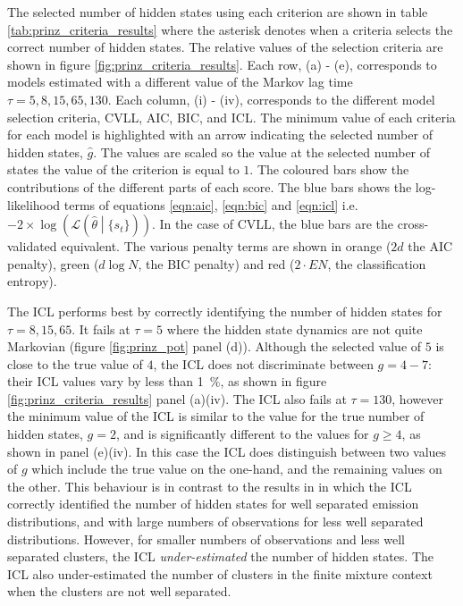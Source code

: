 The selected number of hidden states using each criterion are shown in table \ref{tab:prinz_criteria_results} where the asterisk denotes when a criteria selects the correct number of hidden states. The relative values of the selection criteria are shown in figure \ref{fig:prinz_criteria_results}. Each row, (a) - (e), corresponds to models estimated with a  different value of the Markov lag time $\tau=5, 8, 15, 65, 130$. Each column, (i) - (iv), corresponds to the different model selection criteria, CVLL, AIC, BIC, and ICL. The minimum value of each criteria for each model is highlighted with an arrow indicating the selected number of hidden states, $\hat{g}$. The values are scaled so the value at the selected number of states the value of the criterion is equal to $1$.  The coloured bars show the contributions of the different parts of each score. The blue bars shows the log-likelihood terms of equations \ref{eqn:aic}, \ref{eqn:bic} and \ref{eqn:icl} i.e.  $-2\times \log{\left(\mathcal{L}\left(\hat{\theta}\middle |\{s_t\}\right)\right)}$. In the case of CVLL, the blue bars are the  cross-validated equivalent. The various penalty terms are shown in orange ($2d$ the AIC penalty), green ($d\log{N}$, the BIC penalty) and red ($2\cdot EN$, the classification entropy). 

The ICL performs best by correctly identifying the number of hidden states for $\tau=8, 15, 65$. It fails at $\tau=5$ where the hidden state dynamics are not quite Markovian (figure \ref{fig:prinz_pot} panel (d)). Although the selected value of $5$ is close to the true value of $4$, the ICL does not discriminate between $g=4 - 7$: their ICL values vary by less than \SI{1}{\percent}, as shown in figure \ref{fig:prinz_criteria_results} panel (a)(iv). The ICL also fails at $\tau=130$, however the minimum value of the ICL is similar to the value for the true number of hidden states, $g = 2$, and is significantly different to the values for $g \ge 4$,  as shown in panel (e)(iv). In this case the ICL does distinguish between two values of $g$ which include the true value on the one-hand, and the remaining values on the other. This behaviour is in contrast to the results in \cite{celeuxSelectingHiddenMarkov2008} in which the ICL correctly identified the number of hidden states for well separated emission distributions, and with large numbers of observations for less well separated distributions. However, for smaller numbers of observations and less well separated clusters, the ICL \emph{under-estimated} the number of hidden states. The ICL also under-estimated the number of clusters in the finite mixture context when the clusters are not well separated.\cite{biernackiAssessingMixtureModel2000a}

